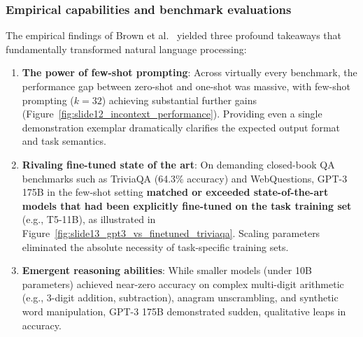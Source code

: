 \documentclass[../../main.tex]{subfiles}
\begin{document}
\subsubsection{Empirical capabilities and benchmark evaluations}
\label{subsec:gpt3_empirical_capabilities}
The empirical findings of Brown et al.~\cite{brown2020} yielded three profound takeaways that fundamentally transformed natural language processing:
\begin{enumerate}
    \item \textbf{The power of few-shot prompting}: Across virtually every benchmark, the performance gap between zero-shot and one-shot was massive, with few-shot prompting ($k = 32$) achieving substantial further gains (Figure~\ref{fig:slide12_incontext_performance}). Providing even a single demonstration exemplar dramatically clarifies the expected output format and task semantics.
    \item \textbf{Rivaling fine-tuned state of the art}: On demanding closed-book QA benchmarks such as TriviaQA (64.3\% accuracy) and WebQuestions, GPT-3 175B in the few-shot setting \textbf{matched or exceeded state-of-the-art models that had been explicitly fine-tuned on the task training set} (e.g., T5-11B), as illustrated in Figure~\ref{fig:slide13_gpt3_vs_finetuned_triviaqa}. Scaling parameters eliminated the absolute necessity of task-specific training sets.
    \item \textbf{Emergent reasoning abilities}: While smaller models (under 10B parameters) achieved near-zero accuracy on complex multi-digit arithmetic (e.g., 3-digit addition, subtraction), anagram unscrambling, and synthetic word manipulation, GPT-3 175B demonstrated sudden, qualitative leaps in accuracy.
\end{enumerate}
\end{document}
